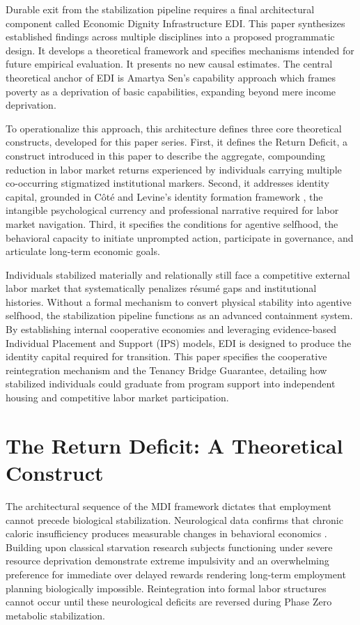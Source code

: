 \documentclass[12pt, letterpaper]{article}
\begin{document}
Durable exit from the stabilization pipeline requires a final architectural component called Economic Dignity Infrastructure EDI. This paper synthesizes established findings across multiple disciplines into a proposed programmatic design. It develops a theoretical framework and specifies mechanisms intended for future empirical evaluation. It presents no new causal estimates. The central theoretical anchor of EDI is Amartya Sen's capability approach \citep{sen1999development} which frames poverty as a deprivation of basic capabilities, expanding beyond mere income deprivation.

To operationalize this approach, this architecture defines three core theoretical constructs, developed for this paper series. First, it defines the Return Deficit, a construct introduced in this paper to describe the aggregate, compounding reduction in labor market returns experienced by individuals carrying multiple co-occurring stigmatized institutional markers. Second, it addresses identity capital, grounded in C\^{o}t\'{e} and Levine's identity formation framework \citep{cote2002identity}, the intangible psychological currency and professional narrative required for labor market navigation. Third, it specifies the conditions for agentive selfhood, the behavioral capacity to initiate unprompted action, participate in governance, and articulate long-term economic goals.

Individuals stabilized materially and relationally still face a competitive external labor market that systematically penalizes r\'{e}sum\'{e} gaps and institutional histories. Without a formal mechanism to convert physical stability into agentive selfhood, the stabilization pipeline functions as an advanced containment system. By establishing internal cooperative economies and leveraging evidence-based Individual Placement and Support (IPS) models, EDI is designed to produce the identity capital required for transition. This paper specifies the cooperative reintegration mechanism and the Tenancy Bridge Guarantee, detailing how stabilized individuals could graduate from program support into independent housing and competitive labor market participation.

\section{The Return Deficit: A Theoretical Construct}

The architectural sequence of the MDI framework dictates that employment cannot precede biological stabilization. Neurological data confirms that chronic caloric insufficiency produces measurable changes in behavioral economics \citep{mullainathan2013scarcity}. Building upon classical starvation research \citep{keys1950biology} subjects functioning under severe resource deprivation demonstrate extreme impulsivity and an overwhelming preference for immediate over delayed rewards rendering long-term employment planning biologically impossible. Reintegration into formal labor structures cannot occur until these neurological deficits are reversed during Phase Zero metabolic stabilization.
\end{document}
